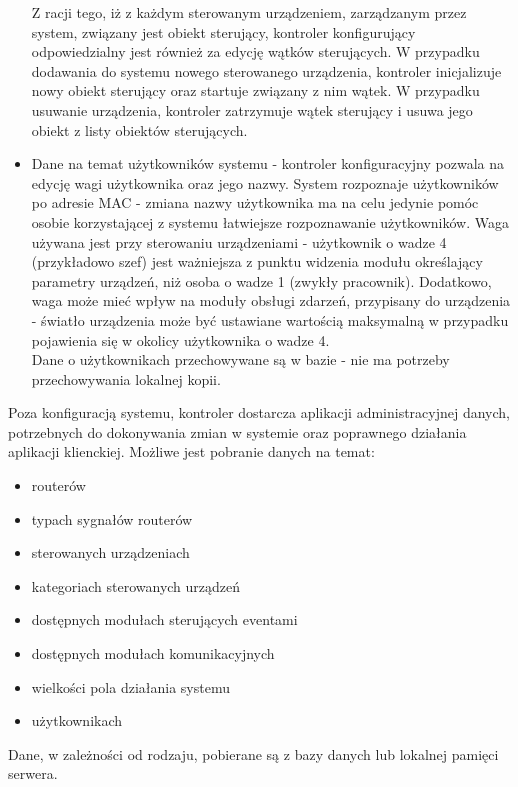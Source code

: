 \documentclass{article}
\begin{document}
\begin{itemize}
			Z racji tego, iż z każdym sterowanym urządzeniem, zarządzanym przez system, związany jest obiekt sterujący, kontroler konfigurujący odpowiedzialny jest również za edycję wątków sterujących. W przypadku dodawania do systemu nowego sterowanego urządzenia, kontroler inicjalizuje nowy obiekt sterujący oraz startuje związany z nim wątek. W przypadku usuwanie urządzenia, kontroler zatrzymuje wątek sterujący i usuwa jego obiekt z listy obiektów sterujących.
			\item Dane na temat użytkowników systemu - kontroler konfiguracyjny pozwala na edycję wagi użytkownika oraz jego nazwy. System rozpoznaje użytkowników po adresie MAC - zmiana nazwy użytkownika ma na celu jedynie pomóc osobie korzystającej z systemu łatwiejsze rozpoznawanie użytkowników. Waga używana jest przy sterowaniu urządzeniami - użytkownik o wadze 4 (przykładowo szef) jest ważniejsza z punktu widzenia modułu określający parametry urządzeń, niż osoba o wadze 1 (zwykły pracownik). Dodatkowo, waga może mieć wpływ na moduły obsługi zdarzeń, przypisany do urządzenia - światło urządzenia może być ustawiane wartością maksymalną w przypadku pojawienia się w okolicy użytkownika o wadze 4.\\
			Dane o użytkownikach przechowywane są w bazie - nie ma potrzeby przechowywania lokalnej kopii.
		\end{itemize}
		Poza konfiguracją systemu, kontroler dostarcza aplikacji administracyjnej danych, potrzebnych do dokonywania zmian w systemie oraz poprawnego działania aplikacji klienckiej. Możliwe jest pobranie danych na temat:
		\begin{itemize}
			\item routerów
			\item typach sygnałów routerów
			\item sterowanych urządzeniach
			\item kategoriach sterowanych urządzeń
			\item dostępnych modułach sterujących eventami
			\item dostępnych modułach komunikacyjnych
			\item wielkości pola działania systemu
			\item użytkownikach
		\end{itemize}
		Dane, w zależności od rodzaju, pobierane są z bazy danych lub lokalnej pamięci serwera.
\end{document}
